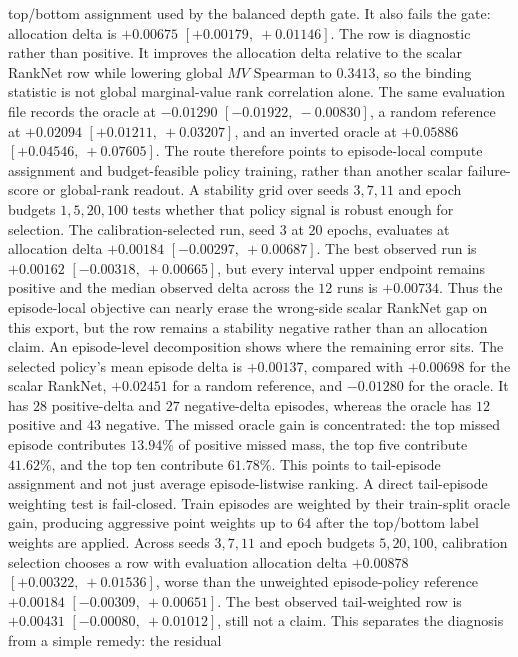 top/bottom assignment used by the balanced depth gate.  It also fails the gate:
allocation delta is $+0.00675$ $[+0.00179,\ +0.01146]$.  The row is diagnostic
rather than positive.  It improves the allocation delta relative to the scalar
RankNet row while lowering global $MV$ Spearman to $0.3413$, so the
binding statistic is not global marginal-value rank correlation alone.  The
same evaluation file records the oracle at $-0.01290$ $[-0.01922,\ -0.00830]$,
a random reference at $+0.02094$ $[+0.01211,\ +0.03207]$, and an inverted
oracle at $+0.05886$ $[+0.04546,\ +0.07605]$.  The route therefore points to
episode-local compute assignment and budget-feasible policy training, rather
than another scalar failure-score or global-rank readout.
A stability grid over seeds $3,7,11$ and epoch budgets $1,5,20,100$ tests
whether that policy signal is robust enough for selection.  The
calibration-selected run, seed $3$ at $20$ epochs, evaluates at allocation
delta $+0.00184$ $[-0.00297,\ +0.00687]$.  The best observed run is
$+0.00162$ $[-0.00318,\ +0.00665]$, but every interval upper endpoint remains
positive and the median observed delta across the $12$ runs is $+0.00734$.
Thus the episode-local objective can nearly erase the wrong-side scalar
RankNet gap on this export, but the row remains a stability negative rather
than an allocation claim.
An episode-level decomposition shows where the remaining error sits.  The
selected policy's mean episode delta is $+0.00137$, compared with $+0.00698$
for the scalar RankNet, $+0.02451$ for a random reference, and $-0.01280$ for
the oracle.  It has $28$ positive-delta and $27$ negative-delta episodes,
whereas the oracle has $12$ positive and $43$ negative.  The missed oracle gain
is concentrated: the top missed episode contributes $13.94\%$ of positive
missed mass, the top five contribute $41.62\%$, and the top ten contribute
$61.78\%$.  This points to tail-episode assignment and not just average
episode-listwise ranking.
A direct tail-episode weighting test is fail-closed.  Train episodes are
weighted by their train-split oracle gain, producing aggressive point weights
up to $64$ after the top/bottom label weights are applied.  Across seeds
$3,7,11$ and epoch budgets $5,20,100$, calibration selection chooses a row with
evaluation allocation delta $+0.00878$ $[+0.00322,\ +0.01536]$, worse than the
unweighted episode-policy reference $+0.00184$ $[-0.00309,\ +0.00651]$.  The
best observed tail-weighted row is $+0.00431$ $[-0.00080,\ +0.01012]$, still
not a claim.  This separates the diagnosis from a simple remedy: the residual
